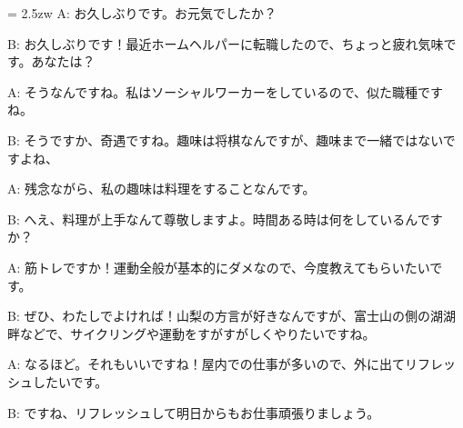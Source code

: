\documentclass[11pt]{amsart}
\title{}
\author{}
\newenvironment{hangall}[1]{\hangindent = 2.5zw\everypar{\hangindent = 2.5zw}}{}
\begin{document}
\maketitle
\begin{hangall}{}%
A: お久しぶりです。お元気でしたか？



B: お久しぶりです！最近ホームヘルパーに転職したので、ちょっと疲れ気味です。あなたは？



A: そうなんですね。私はソーシャルワーカーをしているので、似た職種ですね。



B: そうですか、奇遇ですね。趣味は将棋なんですが、趣味まで一緒ではないですよね、



A: 残念ながら、私の趣味は料理をすることなんです。



B: へえ、料理が上手なんて尊敬しますよ。時間ある時は何をしているんですか？



A: 筋トレですか！運動全般が基本的にダメなので、今度教えてもらいたいです。



B: ぜひ、わたしでよければ！山梨の方言が好きなんですが、富士山の側の湖湖畔などで、サイクリングや運動をすがすがしくやりたいですね。



A: なるほど。それもいいですね！屋内での仕事が多いので、外に出てリフレッシュしたいです。



B: ですね、リフレッシュして明日からもお仕事頑張りましょう。\end{hangall}
\end{document}

